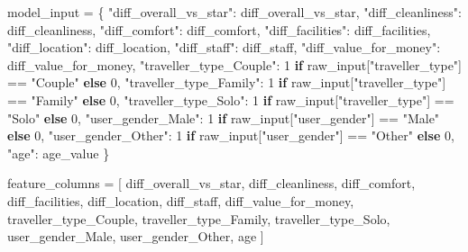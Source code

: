 \documentclass[
  letterpaper,
  DIV=11,
  numbers=noendperiod]{scrartcl}
\newenvironment{Shaded}{\begin{snugshade}}{\end{snugshade}}
\newcommand{\BuiltInTok}[1]{\textcolor[rgb]{0.00,0.23,0.31}{#1}}
\newcommand{\ControlFlowTok}[1]{\textcolor[rgb]{0.00,0.23,0.31}{\textbf{#1}}}
\newcommand{\DecValTok}[1]{\textcolor[rgb]{0.68,0.00,0.00}{#1}}
\newcommand{\NormalTok}[1]{\textcolor[rgb]{0.00,0.23,0.31}{#1}}
\newcommand{\OperatorTok}[1]{\textcolor[rgb]{0.37,0.37,0.37}{#1}}
\newcommand{\StringTok}[1]{\textcolor[rgb]{0.13,0.47,0.30}{#1}}
\begin{document}
\begin{Shaded}
\begin{Highlighting}[]
\NormalTok{    model\_input }\OperatorTok{=}\NormalTok{ \{}
        \StringTok{"diff\_overall\_vs\_star"}\NormalTok{: diff\_overall\_vs\_star,}
        \StringTok{"diff\_cleanliness"}\NormalTok{: diff\_cleanliness,}
        \StringTok{"diff\_comfort"}\NormalTok{: diff\_comfort,}
        \StringTok{"diff\_facilities"}\NormalTok{: diff\_facilities,}
        \StringTok{"diff\_location"}\NormalTok{: diff\_location,}
        \StringTok{"diff\_staff"}\NormalTok{: diff\_staff,}
        \StringTok{"diff\_value\_for\_money"}\NormalTok{: diff\_value\_for\_money,}
        \StringTok{"traveller\_type\_Couple"}\NormalTok{: }\DecValTok{1} \ControlFlowTok{if} \BuiltInTok{raw\_input}\NormalTok{[}\StringTok{"traveller\_type"}\NormalTok{] }\OperatorTok{==} \StringTok{"Couple"} \ControlFlowTok{else} \DecValTok{0}\NormalTok{,}
        \StringTok{"traveller\_type\_Family"}\NormalTok{: }\DecValTok{1} \ControlFlowTok{if} \BuiltInTok{raw\_input}\NormalTok{[}\StringTok{"traveller\_type"}\NormalTok{] }\OperatorTok{==} \StringTok{"Family"} \ControlFlowTok{else} \DecValTok{0}\NormalTok{,}
        \StringTok{"traveller\_type\_Solo"}\NormalTok{: }\DecValTok{1} \ControlFlowTok{if} \BuiltInTok{raw\_input}\NormalTok{[}\StringTok{"traveller\_type"}\NormalTok{] }\OperatorTok{==} \StringTok{"Solo"} \ControlFlowTok{else} \DecValTok{0}\NormalTok{,}
        \StringTok{"user\_gender\_Male"}\NormalTok{: }\DecValTok{1} \ControlFlowTok{if} \BuiltInTok{raw\_input}\NormalTok{[}\StringTok{"user\_gender"}\NormalTok{] }\OperatorTok{==} \StringTok{"Male"} \ControlFlowTok{else} \DecValTok{0}\NormalTok{,}
        \StringTok{"user\_gender\_Other"}\NormalTok{: }\DecValTok{1} \ControlFlowTok{if} \BuiltInTok{raw\_input}\NormalTok{[}\StringTok{"user\_gender"}\NormalTok{] }\OperatorTok{==} \StringTok{"Other"} \ControlFlowTok{else} \DecValTok{0}\NormalTok{,}
        \StringTok{"age"}\NormalTok{: age\_value}
\NormalTok{    \}}

\NormalTok{    feature\_columns }\OperatorTok{=}\NormalTok{ [}
        \StringTok{\textquotesingle{}diff\_overall\_vs\_star\textquotesingle{}}\NormalTok{, }\StringTok{\textquotesingle{}diff\_cleanliness\textquotesingle{}}\NormalTok{, }\StringTok{\textquotesingle{}diff\_comfort\textquotesingle{}}\NormalTok{,}
        \StringTok{\textquotesingle{}diff\_facilities\textquotesingle{}}\NormalTok{, }\StringTok{\textquotesingle{}diff\_location\textquotesingle{}}\NormalTok{, }\StringTok{\textquotesingle{}diff\_staff\textquotesingle{}}\NormalTok{,}
        \StringTok{\textquotesingle{}diff\_value\_for\_money\textquotesingle{}}\NormalTok{, }\StringTok{\textquotesingle{}traveller\_type\_Couple\textquotesingle{}}\NormalTok{,}
        \StringTok{\textquotesingle{}traveller\_type\_Family\textquotesingle{}}\NormalTok{, }\StringTok{\textquotesingle{}traveller\_type\_Solo\textquotesingle{}}\NormalTok{,}
        \StringTok{\textquotesingle{}user\_gender\_Male\textquotesingle{}}\NormalTok{, }\StringTok{\textquotesingle{}user\_gender\_Other\textquotesingle{}}\NormalTok{, }\StringTok{\textquotesingle{}age\textquotesingle{}}
\NormalTok{    ]}


\end{Highlighting}
\end{Shaded}
\end{document}
